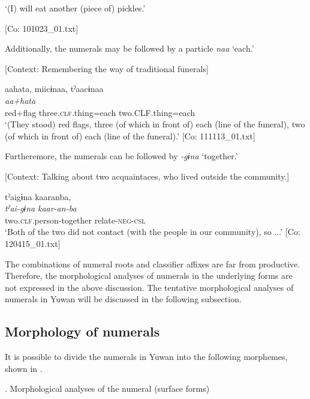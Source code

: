       ‘(I) will eat another (piece of) pickles.’

      [Co: 101023\_01.txt]
  \z
\z

  Additionally, the numerals may be followed by a particle \textit{naa} ‘each.’

\ea \label{ex:7:20}  [Context: Remembering the way of traditional funerals]

\glll  aahata,  miicɨnaa,  tˀaacɨnaa\\
\textit{aa+hata}  \textit{}  \textit{}\\
red+flag  three.\textsc{clf}.thing=each  two.CLF.thing=each\\
\glt ‘(They stood) red flags, three (of which in front of) each (line of the funeral), two (of which in front of) each (line of the funeral).’ [Co: 111113\_01.txt]
\z

  Furtheremore, the numerals can be followed by \textit{{}-gɨna} ‘together.’

\ea \label{ex:7:21}  [Context: Talking about two acquaintaces, who lived outside the community.]

\glll  tˀaigɨna  kaaranba,\\
\textit{tˀai-gɨna}  \textit{kaar-an-ba}\\
two.\textsc{clf}.person-together  relate-\textsc{neg}-\textsc{csl}\\
\glt ‘Both of the two did not contact (with the people in our community), so ...’ [Co: 120415\_01.txt]
\z

The combinations of numeral roots and classifier affixes are far from productive. Therefore, the morphological analyses of numerals in the underlying forms are not expressed in the above discussion. The tentative morphological analyses of numerals in Yuwan will be discussed in the following subsection.

\subsection{Morphology of numerals}

It is possible to divide the numerals in Yuwan into the following morphemes, shown in .

\begin{styleBeschriftung}
\textmd{}\textmd{. Morphological analyses of the numeral (surface forms)}
\end{styleBeschriftung}

